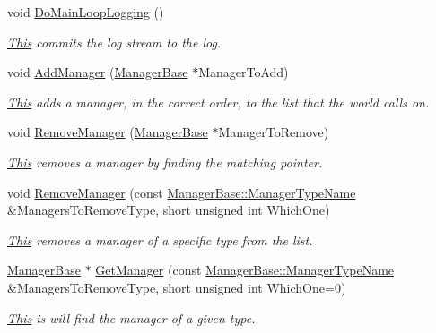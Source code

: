 \begin{DoxyCompactItemize}
void \hyperlink{classphys_1_1World_a1461e6c9d16214aa2cc310035b149378}{DoMainLoopLogging} ()
\begin{DoxyCompactList}\small\item\em \hyperlink{structThis}{This} commits the log stream to the log. \item\end{DoxyCompactList}\item 
void \hyperlink{classphys_1_1World_aa709932e21d9d19a91ee38cd7a575556}{AddManager} (\hyperlink{classphys_1_1ManagerBase}{ManagerBase} $\ast$ManagerToAdd)
\begin{DoxyCompactList}\small\item\em \hyperlink{structThis}{This} adds a manager, in the correct order, to the list that the world calls on. \item\end{DoxyCompactList}\item 
void \hyperlink{classphys_1_1World_ae3be85997185935421bf5230651d8e37}{RemoveManager} (\hyperlink{classphys_1_1ManagerBase}{ManagerBase} $\ast$ManagerToRemove)
\begin{DoxyCompactList}\small\item\em \hyperlink{structThis}{This} removes a manager by finding the matching pointer. \item\end{DoxyCompactList}\item 
void \hyperlink{classphys_1_1World_ad885d1102ecdd13cc277ee3f7dfcb742}{RemoveManager} (const \hyperlink{classphys_1_1ManagerBase_aaa6ccddf23892eaccb898529414f80a5}{ManagerBase::ManagerTypeName} \&ManagersToRemoveType, short unsigned int WhichOne)
\begin{DoxyCompactList}\small\item\em \hyperlink{structThis}{This} removes a manager of a specific type from the list. \item\end{DoxyCompactList}\item 
\hyperlink{classphys_1_1ManagerBase}{ManagerBase} $\ast$ \hyperlink{classphys_1_1World_a910befc904c0d0e73b913dedd08e9d98}{GetManager} (const \hyperlink{classphys_1_1ManagerBase_aaa6ccddf23892eaccb898529414f80a5}{ManagerBase::ManagerTypeName} \&ManagersToRemoveType, short unsigned int WhichOne=0)
\begin{DoxyCompactList}\small\item\em \hyperlink{structThis}{This} is will find the manager of a given type. \item\end{DoxyCompactList}\item 

\end{DoxyCompactItemize}
